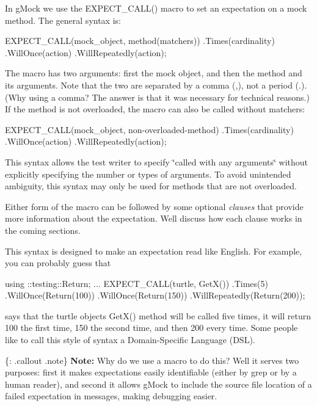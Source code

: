In g\+Mock we use the {\ttfamily E\+X\+P\+E\+C\+T\+\_\+\+C\+A\+L\+L()} macro to set an expectation on a mock method. The general syntax is\+:


\begin{DoxyCode}
EXPECT\_CALL(mock\_object, method(matchers))
    .Times(cardinality)
    .WillOnce(action)
    .WillRepeatedly(action);
\end{DoxyCode}


The macro has two arguments\+: first the mock object, and then the method and its arguments. Note that the two are separated by a comma ({\ttfamily ,}), not a period ({\ttfamily .}). (Why using a comma? The answer is that it was necessary for technical reasons.) If the method is not overloaded, the macro can also be called without matchers\+:


\begin{DoxyCode}
EXPECT\_CALL(mock\_object, non-overloaded-method)
    .Times(cardinality)
    .WillOnce(action)
    .WillRepeatedly(action);
\end{DoxyCode}


This syntax allows the test writer to specify \char`\"{}called with any arguments\char`\"{} without explicitly specifying the number or types of arguments. To avoid unintended ambiguity, this syntax may only be used for methods that are not overloaded.

Either form of the macro can be followed by some optional {\itshape clauses} that provide more information about the expectation. We\textquotesingle{}ll discuss how each clause works in the coming sections.

This syntax is designed to make an expectation read like English. For example, you can probably guess that


\begin{DoxyCode}
using ::testing::Return;
...
EXPECT\_CALL(turtle, GetX())
    .Times(5)
    .WillOnce(Return(100))
    .WillOnce(Return(150))
    .WillRepeatedly(Return(200));
\end{DoxyCode}


says that the {\ttfamily turtle} object\textquotesingle{}s {\ttfamily Get\+X()} method will be called five times, it will return 100 the first time, 150 the second time, and then 200 every time. Some people like to call this style of syntax a Domain-\/\+Specific Language (D\+SL).

\{\+: .callout .note\} {\bfseries Note\+:} Why do we use a macro to do this? Well it serves two purposes\+: first it makes expectations easily identifiable (either by {\ttfamily grep} or by a human reader), and second it allows g\+Mock to include the source file location of a failed expectation in messages, making debugging easier.

